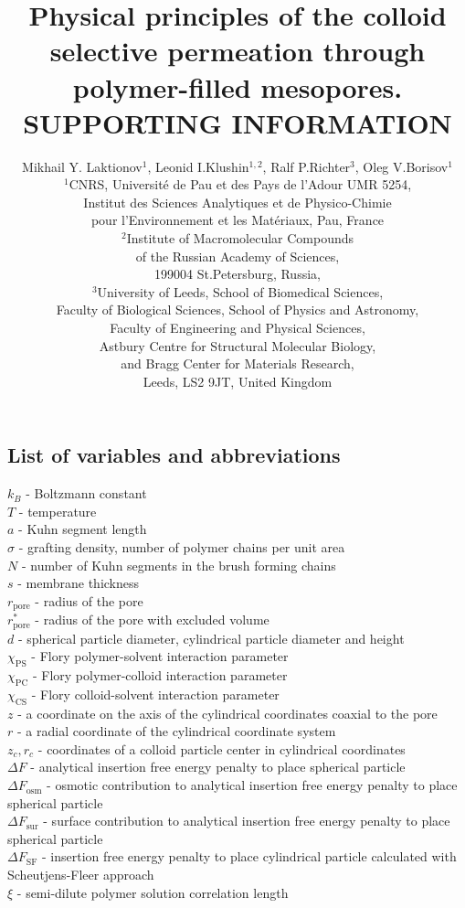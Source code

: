 \documentclass[12pt, a4paper]{article}
\title{Physical principles of the colloid selective permeation through polymer-filled mesopores.\\
        SUPPORTING INFORMATION}
\author{Mikhail Y. Laktionov$^1$, Leonid I.Klushin$^{1,2}$, Ralf P.Richter$^3$, Oleg V.Borisov$^1$\\
$^{1}$CNRS, Universit\'e de Pau et des Pays de l'Adour UMR 5254,\\
Institut des Sciences Analytiques et de Physico-Chimie\\
pour l'Environnement et les Mat\'eriaux, Pau, France \\
$^{2}$Institute of Macromolecular Compounds \\
of the Russian Academy of Sciences, \\
199004 St.Petersburg, Russia,\\
$^{3}$University of Leeds, School of Biomedical Sciences, \\
Faculty of Biological Sciences, 
School of Physics and Astronomy, \\
Faculty of Engineering and Physical Sciences,\\  
Astbury Centre for Structural Molecular Biology,\\ 
and Bragg Center for Materials Research,\\ 
Leeds, LS2 9JT, United Kingdom}
\begin{document}
\maketitle

\subsection*{List of variables and abbreviations}
$k_B$ - Boltzmann constant \\
$T$ - temperature \\
$a$ - Kuhn segment length \\
$\sigma$ - grafting density, number of polymer chains per unit area \\
$N$ - number of Kuhn segments in the brush forming chains \\
$s$ - membrane thickness \\
$r_{\textrm{pore}}$ - radius of the pore \\
$r^{\ast}_{\textrm{pore}}$ - radius of the pore with excluded volume \\
$d$ - spherical particle diameter, cylindrical particle diameter and height \\ 
$\chi_{\textrm{PS}}$ - Flory polymer-solvent interaction parameter  \\
$\chi_{\textrm{PC}}$ - Flory polymer-colloid interaction parameter  \\
$\chi_{\textrm{CS}}$ - Flory colloid-solvent interaction parameter  \\
$z$ - a coordinate on the axis of the cylindrical coordinates coaxial to the pore \\
$r$ - a radial coordinate of the cylindrical coordinate system \\
$z_{c}, r_{c}$ - coordinates of a colloid particle center in cylindrical coordinates \\
$\Delta F$ - analytical insertion free energy penalty to place spherical particle \\
$\Delta F_{\textrm{osm}}$ - osmotic contribution to analytical insertion free energy penalty to place spherical particle \\
$\Delta F_{\textrm{sur}}$ - surface contribution to analytical insertion free energy penalty to place spherical particle \\
$\Delta F_{\textrm{SF}}$ - insertion free energy penalty to place cylindrical particle calculated with Scheutjens-Fleer approach \\
$\xi$ - semi-dilute polymer solution correlation length \\
\end{document}

